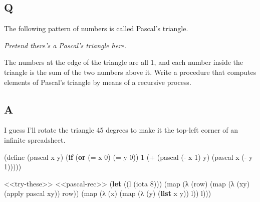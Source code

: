 \documentclass[
]{article}
\newenvironment{Shaded}{}{}
\newcommand{\DecValTok}[1]{\textcolor[rgb]{0.25,0.63,0.44}{#1}}
\newcommand{\ExtensionTok}[1]{#1}
\newcommand{\FunctionTok}[1]{\textcolor[rgb]{0.02,0.16,0.49}{#1}}
\newcommand{\KeywordTok}[1]{\textcolor[rgb]{0.00,0.44,0.13}{\textbf{#1}}}
\newcommand{\NormalTok}[1]{#1}
\newcommand{\OperatorTok}[1]{\textcolor[rgb]{0.40,0.40,0.40}{#1}}
\begin{document}
\hypertarget{q-11}{%
\subsection{Q}\label{q-11}}

The following pattern of numbers is called Pascal's triangle.

\emph{Pretend there's a Pascal's triangle here.}

The numbers at the edge of the triangle are all 1, and each number
inside the triangle is the sum of the two numbers above it. Write a
procedure that computes elements of Pascal's triangle by means of a
recursive process.

\hypertarget{a-10}{%
\subsection{A}\label{a-10}}

I guess I'll rotate the triangle 45 degrees to make it the top-left
corner of an infinite spreadsheet.

\hypertarget{pascal-rec}{%
\label{pascal-rec}}%
\begin{Shaded}
\begin{Highlighting}[numbers=left,,]
\NormalTok{(}\ExtensionTok{define}\FunctionTok{ }\NormalTok{(pascal x y)}
\NormalTok{  (}\KeywordTok{if}\NormalTok{ (}\KeywordTok{or}\NormalTok{ (}\OperatorTok{=}\NormalTok{ x }\DecValTok{0}\NormalTok{)}
\NormalTok{          (}\OperatorTok{=}\NormalTok{ y }\DecValTok{0}\NormalTok{))}
      \DecValTok{1}
\NormalTok{      (}\OperatorTok{+}\NormalTok{ (pascal (}\OperatorTok{{-}}\NormalTok{ x }\DecValTok{1}\NormalTok{) y)}
\NormalTok{         (pascal x (}\OperatorTok{{-}}\NormalTok{ y }\DecValTok{1}\NormalTok{)))))}
\end{Highlighting}
\end{Shaded}

\begin{Shaded}
\begin{Highlighting}[numbers=left,,]
\NormalTok{\textless{}\textless{}try{-}these\textgreater{}\textgreater{}}
\NormalTok{\textless{}\textless{}pascal{-}rec\textgreater{}\textgreater{}}
\NormalTok{(}\KeywordTok{let}\NormalTok{ ((l (iota }\DecValTok{8}\NormalTok{)))}
\NormalTok{  (map (λ (row)}
\NormalTok{         (map (λ (xy)}
\NormalTok{                (apply pascal xy))}
\NormalTok{              row))}
\NormalTok{       (map (λ (x)}
\NormalTok{              (map (λ (y)}
\NormalTok{                     (}\KeywordTok{list}\NormalTok{ x y))}
\NormalTok{                   l))}
\NormalTok{            l)))}
\end{Highlighting}
\end{Shaded}
\end{document}
